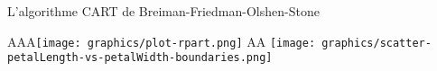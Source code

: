 


\begin{frame}{\vskip -0.2cm \large L'algorithme CART de Breiman-Friedman-Olshen-Stone}

\small

\begin{multicols}{2}

	\begin{flushright}
	\begin{minipage}{4.5cm}
	\vskip -0.4cm
	{\color{white}AAA}\texttt{[image: graphics/plot-rpart.png]}
	\vskip 0.1cm 
	{\color{white}AA}
	\texttt{[image: graphics/scatter-petalLength-vs-petalWidth-boundaries.png]}
	\end{minipage}
	\end{flushright}

\columnbreak


\end{multicols}
\end{frame}
